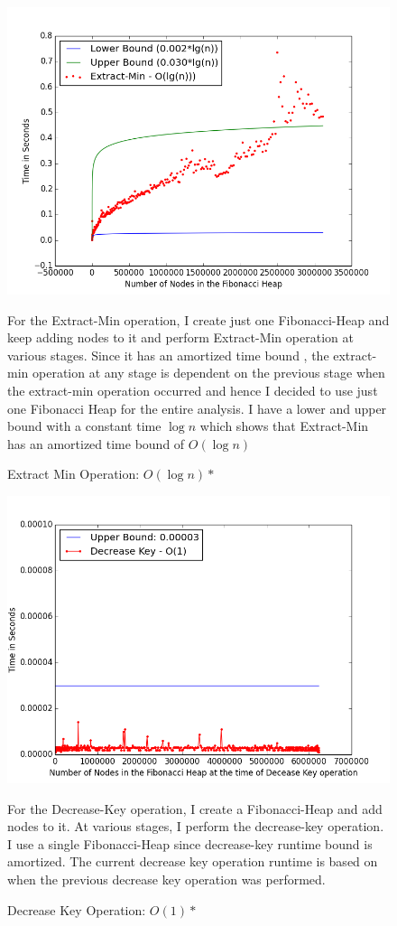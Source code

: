 \begin{figure}
\includegraphics[width=0.95\columnwidth]{Figures/fibonacciHeapPerformanceExtractMin}
\caption{Extract Min Operation: $O(\log{n})*$}
\label{performanceExtractMin}
For the Extract-Min operation, I create just one Fibonacci-Heap and keep adding nodes to it and perform Extract-Min operation at various stages. Since it has an amortized time bound , the extract-min operation at any stage is dependent on the previous stage when the extract-min operation occurred and hence I decided to use just one Fibonacci Heap for the entire analysis. I have a lower and upper bound with a constant time $\log{n}$ which shows that Extract-Min has an amortized time bound of $O(\log{n})$
\end{figure}
\begin{figure}
\includegraphics[width=0.95\columnwidth]{Figures/fibonacciHeapPerformanceDecreaseKey}
\caption{Decrease Key Operation: $O(1)*$}
\label{performanceDecreaseKey}
For the Decrease-Key operation, I create a Fibonacci-Heap and add nodes to it. At various stages, I perform the decrease-key operation. I use a single Fibonacci-Heap since decrease-key runtime bound is amortized. The current decrease key operation runtime is based on when the previous decrease key operation was performed.
\end{figure}
